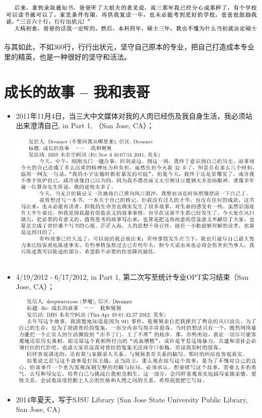 \documentclass[9pt, b5paper]{article}
\begin{document}
\begin{center}
\includegraphics[width=.9\linewidth]{./pic/backups_plans_20210424_092841.png}
\end{center}

与其如此，不如360行，行行出状元，坚守自己原本的专业，把自己打造成本专业里的精英，也是一种很好的坚守和活法。


\section{成长的故事 -- 我和表哥}
\label{sec:orgf93c03e}
\begin{itemize}
\item 2011年11月4日，当三大中文媒体对我的人肉已经伤及我自身生活，我必须站出来澄清自己, in Part 1, （San Jose, CA）；

\begin{center}
\includegraphics[width=.9\linewidth]{./pic/dreamer1.png}
\end{center}
\item 4/19/2012 - 6/17/2012, in Part 1, 第二次写至统计专业OPT实习结束（San Jose, CA）；

\begin{center}
\includegraphics[width=.9\linewidth]{./pic/dreamer2.png}
\end{center}
\item 2014年夏天，写于SJSU Library (San Jose State University Public Library, San Jose, CA)


\end{itemize}
\end{document}

